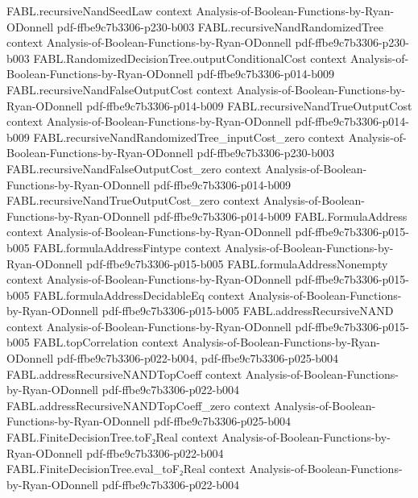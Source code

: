 \begin{theorem}
\proofstep
  {FABL.recursiveNandSeedLaw}
  {context}
  {Analysis-of-Boolean-Functions-by-Ryan-ODonnell}
  {pdf-ffbe9c7b3306-p230-b003}
\proofstep
  {FABL.recursiveNandRandomizedTree}
  {context}
  {Analysis-of-Boolean-Functions-by-Ryan-ODonnell}
  {pdf-ffbe9c7b3306-p230-b003}
\proofstep
  {FABL.RandomizedDecisionTree.outputConditionalCost}
  {context}
  {Analysis-of-Boolean-Functions-by-Ryan-ODonnell}
  {pdf-ffbe9c7b3306-p014-b009}
\proofstep
  {FABL.recursiveNandFalseOutputCost}
  {context}
  {Analysis-of-Boolean-Functions-by-Ryan-ODonnell}
  {pdf-ffbe9c7b3306-p014-b009}
\proofstep
  {FABL.recursiveNandTrueOutputCost}
  {context}
  {Analysis-of-Boolean-Functions-by-Ryan-ODonnell}
  {pdf-ffbe9c7b3306-p014-b009}
\proofstep
  {FABL.recursiveNandRandomizedTree_inputCost_zero}
  {context}
  {Analysis-of-Boolean-Functions-by-Ryan-ODonnell}
  {pdf-ffbe9c7b3306-p230-b003}
\proofstep
  {FABL.recursiveNandFalseOutputCost_zero}
  {context}
  {Analysis-of-Boolean-Functions-by-Ryan-ODonnell}
  {pdf-ffbe9c7b3306-p014-b009}
\proofstep
  {FABL.recursiveNandTrueOutputCost_zero}
  {context}
  {Analysis-of-Boolean-Functions-by-Ryan-ODonnell}
  {pdf-ffbe9c7b3306-p014-b009}
\proofstep
  {FABL.FormulaAddress}
  {context}
  {Analysis-of-Boolean-Functions-by-Ryan-ODonnell}
  {pdf-ffbe9c7b3306-p015-b005}
\proofstep
  {FABL.formulaAddressFintype}
  {context}
  {Analysis-of-Boolean-Functions-by-Ryan-ODonnell}
  {pdf-ffbe9c7b3306-p015-b005}
\proofstep
  {FABL.formulaAddressNonempty}
  {context}
  {Analysis-of-Boolean-Functions-by-Ryan-ODonnell}
  {pdf-ffbe9c7b3306-p015-b005}
\proofstep
  {FABL.formulaAddressDecidableEq}
  {context}
  {Analysis-of-Boolean-Functions-by-Ryan-ODonnell}
  {pdf-ffbe9c7b3306-p015-b005}
\proofstep
  {FABL.addressRecursiveNAND}
  {context}
  {Analysis-of-Boolean-Functions-by-Ryan-ODonnell}
  {pdf-ffbe9c7b3306-p015-b005}
\proofstep
  {FABL.topCorrelation}
  {context}
  {Analysis-of-Boolean-Functions-by-Ryan-ODonnell}
  {pdf-ffbe9c7b3306-p022-b004,
    pdf-ffbe9c7b3306-p025-b004}
\proofstep
  {FABL.addressRecursiveNANDTopCoeff}
  {context}
  {Analysis-of-Boolean-Functions-by-Ryan-ODonnell}
  {pdf-ffbe9c7b3306-p022-b004}
\proofstep
  {FABL.addressRecursiveNANDTopCoeff_zero}
  {context}
  {Analysis-of-Boolean-Functions-by-Ryan-ODonnell}
  {pdf-ffbe9c7b3306-p025-b004}
\proofstep
  {FABL.FiniteDecisionTree.toF₂Real}
  {context}
  {Analysis-of-Boolean-Functions-by-Ryan-ODonnell}
  {pdf-ffbe9c7b3306-p022-b004}
\proofstep
  {FABL.FiniteDecisionTree.eval_toF₂Real}
  {context}
  {Analysis-of-Boolean-Functions-by-Ryan-ODonnell}
  {pdf-ffbe9c7b3306-p022-b004}
\proofstep

\end{theorem}
